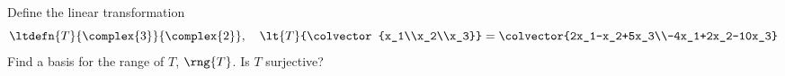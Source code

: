 Define the linear transformation
%
\begin{equation*}
\ltdefn{T}{\complex{3}}{\complex{2}},\quad
\lt{T}{\colvector{x_1\\x_2\\x_3}}=\colvector{2x_1-x_2+5x_3\\-4x_1+2x_2-10x_3}
\end{equation*}
%
Find a basis for the range of $T$, $\rng{T}$.  Is $T$ surjective? 